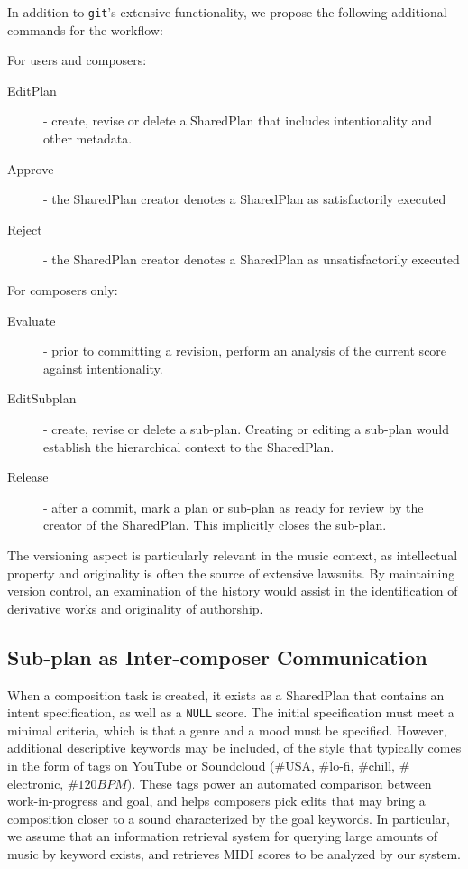 \documentclass[final,authoryear,5p,times,twocolumn]{elsarticle}
\begin{document}
In addition to \texttt{git}'s extensive functionality, we propose the following additional commands for the workflow:

\noindent For users and composers:
\begin{description}
    \item [EditPlan] - create, revise or delete a SharedPlan that includes intentionality and other metadata.
    \item [Approve] - the SharedPlan creator denotes a SharedPlan as satisfactorily executed
    \item [Reject] - the SharedPlan creator denotes a SharedPlan as unsatisfactorily executed
\end{description}

\noindent For composers only:
\begin{description}
    \item [Evaluate] - prior to committing a revision, perform an analysis of the current score against intentionality.
    \item [EditSubplan] - create, revise or delete a sub-plan. Creating or editing a sub-plan would establish the hierarchical context to the SharedPlan.
    \item [Release] - after a commit, mark a plan or sub-plan as ready for review by the creator of the SharedPlan. This implicitly closes the sub-plan.
\end{description}

The versioning aspect is particularly relevant in the music context, as intellectual property and originality is often the source of extensive lawsuits. By maintaining version control, an examination of the history would assist in the identification of derivative works and originality of authorship.

\subsection{Sub-plan as Inter-composer Communication}
 
When a composition task is created, it exists as a SharedPlan that contains an intent specification, as well as a \texttt{NULL} score. The initial specification must meet a minimal criteria, which is that a genre and a mood must be specified. However, additional descriptive keywords may be included, of the style that typically comes in the form of tags on YouTube or Soundcloud ($\#$USA, $\#$lo-fi, $\#$chill, $\#$electronic, $\#120BPM$). These tags power an automated comparison between work-in-progress and goal, and helps composers pick edits that may bring a composition closer to a sound characterized by the goal keywords. In particular, we assume that an information retrieval system for querying large amounts of music by keyword exists, and retrieves MIDI scores to be analyzed by our system.
\end{document}
